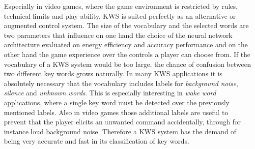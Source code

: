 Especially in video games, where the game environment is restricted by rules, technical limits and play-ability, KWS is suited perfectly as an alternative or augmented control system.
The size of the vocabulary and the selected words are two parameters that influence on one hand the choice of the neural network architecture evaluated on energy efficiency and accuracy performance and on the other hand the game experience over the controls a player can choose from.
If the vocabulary of a KWS system would be too large, the chance of confusion between two different key words grows naturally.
In many KWS applications it is absolutely necessary that the vocabulary includes labels for \emph{background noise}, \emph{silence} and \emph{unknown words}. 
This is especially interesting in \emph{wake word} applications, where a single key word must be detected over the previously mentioned labels.
Also in video games those additional labels are useful to prevent that the player elicits an unwanted command accidentally, through for instance loud background noise.
Therefore a KWS system has the demand of being very accurate and fast in its classification of key words.



